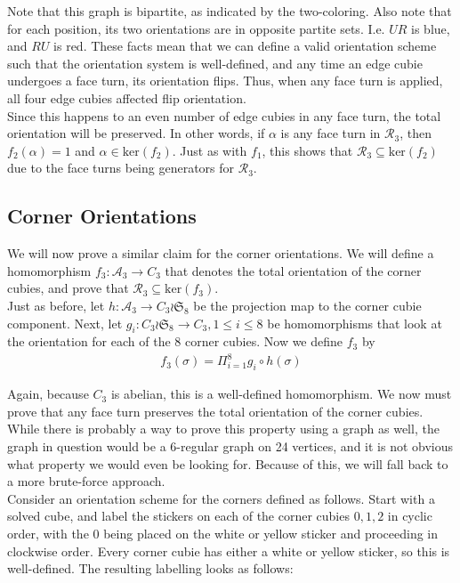 \documentclass[10pt,letterpaper]{report}
\begin{document}
Note that this graph is bipartite, as indicated by the two-coloring.  Also note that for each position, its two orientations are in opposite partite sets.  I.e. $UR$ is blue, and $RU$ is red.  These facts mean that we can define a valid orientation scheme such that the orientation system is well-defined, and any time an edge cubie undergoes a face turn, its orientation flips.  Thus, when any face turn is applied, all four edge cubies affected flip orientation. \\

Since this happens to an even number of edge cubies in any face turn, the total orientation will be preserved.  In other words, if $\alpha$ is any face turn in $\mathcal{R}_3$, then $f_2(\alpha) = 1$ and $\alpha \in \text{ker}(f_2)$.  Just as with $f_1$, this shows that $\mathcal{R}_3 \subseteq \text{ker}(f_2)$ due to the face turns being generators for $\mathcal{R}_3$.

\subsection{Corner Orientations}

We will now prove a similar claim for the corner orientations.  We will define a homomorphism $f_3 : \mathcal{A}_3 \rightarrow C_3$ that denotes the total orientation of the corner cubies, and prove that $\mathcal{R}_3 \subseteq \text{ker}(f_3)$. \\

Just as before, let $h: \mathcal{A}_3 \rightarrow C_3 \wr \mathfrak{S}_8$ be the projection map to the corner cubie component.  Next, let $g_i: C_3 \wr \mathfrak{S}_8 \rightarrow C_3, 1 \leq i \leq 8$ be homomorphisms that look at the orientation for each of the 8 corner cubies.  Now we define $f_3$ by
\begin{align*}
f_3(\sigma) = \Pi_{i=1}^{8}g_i \circ h (\sigma)
\end{align*}

Again, because $C_3$ is abelian, this is a well-defined homomorphism.  We now must prove that any face turn preserves the total orientation of the corner cubies.  While there is probably a way to prove this property using a graph as well, the graph in question would be a 6-regular graph on 24 vertices, and it is not obvious what property we would even be looking for.  Because of this, we will fall back to a more brute-force approach.  \\

Consider an orientation scheme for the corners defined as follows.  Start with a solved cube, and label the stickers on each of the corner cubies $0,1,2$ in cyclic order, with the $0$ being placed on the white or yellow sticker and proceeding in clockwise order.  Every corner cubie has either a white or yellow sticker, so this is well-defined.  The resulting labelling looks as follows:
\end{document}
